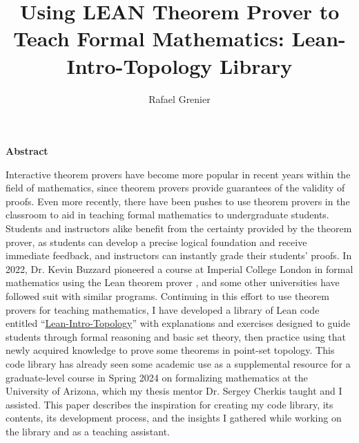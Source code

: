 \documentclass[11pt, oneside]{book}
\title{Using LEAN Theorem Prover to Teach Formal Mathematics:
Lean-Intro-Topology Library}
\author{Rafael Grenier}
\begin{document}
\frontmatter
\maketitle
\newpage
{
  \vfill
  \LARGE 
  \textbf{Abstract}
  \normalsize

  Interactive theorem provers have become more popular in recent
  years within the field of mathematics, since theorem provers provide
  guarantees of the validity of proofs. Even more
  recently, there have been pushes to use theorem provers in the
  classroom to aid in teaching formal mathematics to undergraduate 
  students. Students and instructors alike benefit from the certainty
  provided by the theorem prover, as students can develop a precise
  logical foundation and receive immediate feedback, and instructors 
  can instantly grade their students' proofs. In 2022, Dr. Kevin Buzzard 
  pioneered a course at Imperial College London in formal mathematics
  using the Lean theorem prover \cite{Buzzard}, and some
  other universities have followed suit with similar programs.
  Continuing in this effort to use theorem provers for teaching mathematics,
  I have developed a library of Lean code entitled 
  ``\href{https://github.com/rafaelgrenier/lean-intro-topology/}{Lean-Intro-Topology}''
  with explanations and exercises designed to guide students through 
  formal reasoning and basic set theory, then practice using that newly
  acquired knowledge to prove some theorems in point-set topology.
  This code library has already seen some academic use as a supplemental
  resource for a graduate-level course in Spring 2024
  on formalizing mathematics at the University of Arizona, which my 
  thesis mentor Dr. Sergey Cherkis taught and I assisted. 
  This paper describes the inspiration for creating my code library, 
  its contents, its development process, and the insights I gathered
  while working on the library and as a teaching assistant.

  \vfill
}
\tableofcontents

\mainmatter





\end{document}
